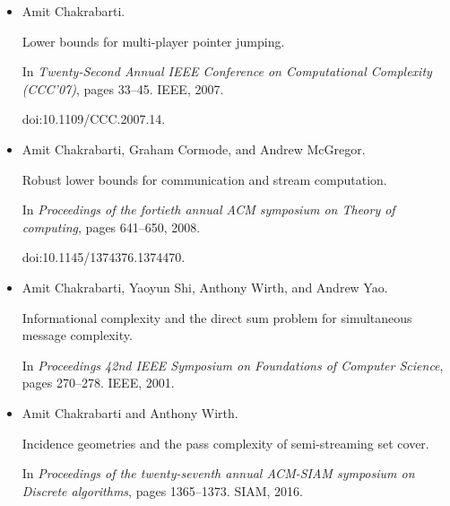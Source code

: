 \documentclass[10pt,a4paper]{article}
\begin{document}
\begin{itemize}
Beyond set disjointness: The communication complexity of finding the
intersection.


In \emph{Proceedings of the 2014 ACM Symposium on Principles of
Distributed Computing}, PODC ’14, pages 106–113, New York, NY, USA, 2014.
Association for Computing Machinery.


doi:10.1145/2611462.2611501.





\item[] 
[15]

Amit Chakrabarti.


Lower bounds for multi-player pointer jumping.


In \emph{Twenty-Second Annual IEEE Conference on Computational
Complexity (CCC’07)}, pages 33–45. IEEE, 2007.


doi:10.1109/CCC.2007.14.





\item[] 
[16]

Amit Chakrabarti, Graham Cormode, and Andrew McGregor.


Robust lower bounds for communication and stream computation.


In \emph{Proceedings of the fortieth annual ACM symposium on Theory of
computing}, pages 641–650, 2008.


doi:10.1145/1374376.1374470.





\item[] 
[17]

Amit Chakrabarti, Yaoyun Shi, Anthony Wirth, and Andrew Yao.


Informational complexity and the direct sum problem for simultaneous
message complexity.


In \emph{Proceedings 42nd IEEE Symposium on Foundations of Computer
Science}, pages 270–278. IEEE, 2001.





\item[] 
[18]

Amit Chakrabarti and Anthony Wirth.


Incidence geometries and the pass complexity of semi-streaming set
cover.


In \emph{Proceedings of the twenty-seventh annual ACM-SIAM symposium
on Discrete algorithms}, pages 1365–1373. SIAM, 2016.



\end{itemize}
\end{document}
